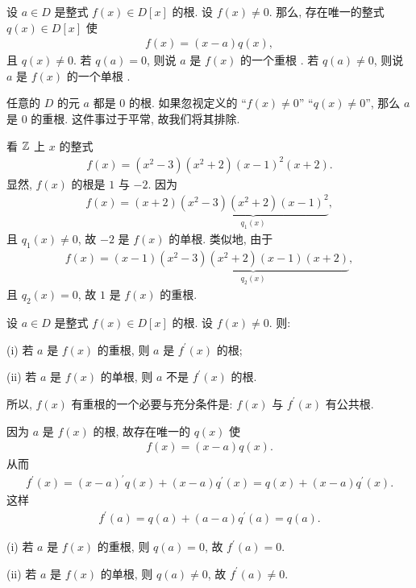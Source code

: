 \begin{definition}
    设 $a \in D$ 是整式 $f(x) \in D[x]$ 的根. 设 $f(x) \neq 0$. 那么, 存在唯一的整式 $q(x) \in D[x]$ 使
    \begin{align*}
        f(x) = (x - a) q(x),
    \end{align*}
    且 $q(x) \neq 0$. 若 $q(a) = 0$, 则说 $a$ 是 $f(x)$ 的一个重根 . 若 $q(a) \neq 0$, 则说 $a$ 是 $f(x)$ 的一个单根 .
\end{definition}

\begin{remark}
    任意的 $D$ 的元 $a$ 都是 $0$ 的根. 如果忽视定义的 ``$f(x) \neq 0$'' ``$q(x) \neq 0$'', 那么 $a$ 是 $0$ 的重根. 这件事过于平常, 故我们将其排除.
\end{remark}

\begin{example}
    看 $\mathbb{Z}$ 上 $x$ 的整式
    \begin{align*}
        f(x) = (x^2 - 3)(x^2 + 2)(x - 1)^2 (x + 2).
    \end{align*}
    显然, $f(x)$ 的根是 $1$ 与 $-2$. 因为
    \begin{align*}
        f(x) = (x + 2) \underbrace{(x^2 - 3)(x^2 + 2)(x - 1)^2}_{q_1 (x)},
    \end{align*}
    且 $q_1 (x) \neq 0$, 故 $-2$ 是 $f(x)$ 的单根. 类似地, 由于
    \begin{align*}
        f(x) = (x - 1) \underbrace{(x^2 - 3)(x^2 + 2)(x - 1)(x + 2)}_{q_2 (x)},
    \end{align*}
    且 $q_2 (x) = 0$, 故 $1$ 是 $f(x)$ 的重根.
\end{example}

\begin{proposition}
    设 $a \in D$ 是整式 $f(x) \in D[x]$ 的根. 设 $f(x) \neq 0$. 则:

    (i) 若 $a$ 是 $f(x)$ 的重根, 则 $a$ 是 $f^{\prime} (x)$ 的根;

    (ii) 若 $a$ 是 $f(x)$ 的单根, 则 $a$ 不是 $f^{\prime} (x)$ 的根.

    所以, $f(x)$ 有重根的一个必要与充分条件是: $f(x)$ 与 $f^{\prime} (x)$ 有公共根.
\end{proposition}

\begin{pf}
    因为 $a$ 是 $f(x)$ 的根, 故存在唯一的 $q(x)$ 使
    \begin{align*}
        f(x) = (x - a) q(x).
    \end{align*}
    从而
    \begin{align*}
        f^{\prime} (x) = (x - a)^{\prime} q(x) + (x - a) q^{\prime} (x) = q(x) + (x - a) q^{\prime} (x).
    \end{align*}
    这样
    \begin{align*}
        f^{\prime} (a) = q(a) + (a - a) q^{\prime} (a) = q(a).
    \end{align*}

    (i) 若 $a$ 是 $f(x)$ 的重根, 则 $q(a) = 0$, 故 $f^{\prime} (a) = 0$.

    (ii) 若 $a$ 是 $f(x)$ 的单根, 则 $q(a) \neq 0$, 故 $f^{\prime} (a) \neq 0$.
\end{pf}

